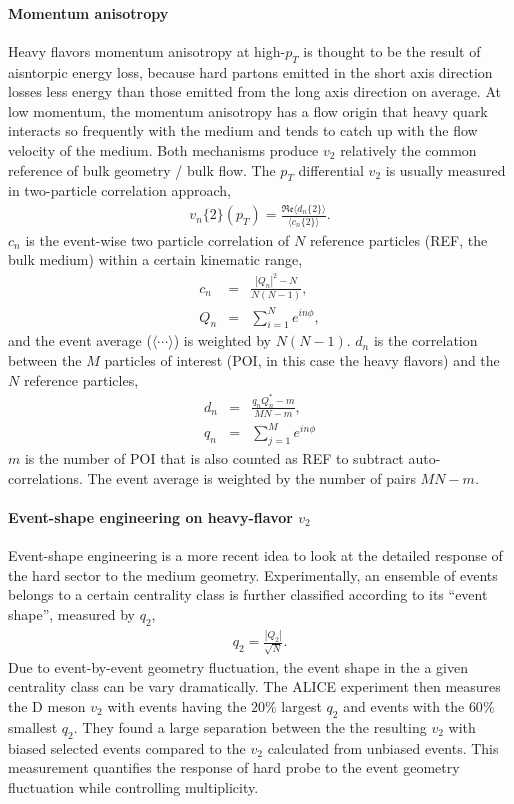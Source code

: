 \paragraph{Momentum anisotropy}
Heavy flavors momentum anisotropy at high-$p_T$ is thought to be the result of aisntorpic energy loss, because hard partons emitted in the short axis direction losses less energy than those emitted from the long axis direction on average.
At low momentum, the momentum anisotropy has a flow origin that heavy quark interacts so frequently with the medium and tends to catch up with the flow velocity of the medium.
Both mechanisms produce $v_2$ relatively the common reference of bulk geometry / bulk flow.
The $p_T$ differential $v_2$ is usually measured in two-particle correlation approach,
\begin{eqnarray}
v_n\{2\}(p_T) = \frac{\mathfrak{Re}\langle d_n\{2\} \rangle}{\langle c_n\{2\}\rangle}.
\end{eqnarray}
$c_n$ is the event-wise two particle correlation of $N$ reference particles (REF, the bulk medium) within a certain kinematic range,
\begin{eqnarray}
c_n &=& \frac{|Q_n|^2 - N}{N(N-1)},  \\
Q_n &=& \sum_{i=1}^N e^{i n \phi},
\end{eqnarray}
and the event average ($\langle\cdots\rangle$) is weighted by $N(N-1)$.
$d_n$ is the correlation between the $M$ particles of interest (POI, in this case the heavy flavors) and the $N$ reference particles,
\begin{eqnarray}
d_n &=& \frac{q_n Q_n^* - m}{MN-m},  \\
q_n &=& \sum_{j=1}^M e^{i n \phi}
\end{eqnarray}
$m$ is the number of POI that is also counted as REF to subtract auto-correlations. 
The event average is weighted by the number of pairs $MN-m$.

\paragraph{Event-shape engineering on heavy-flavor $v_2$}
Event-shape engineering is a more recent idea to look at the detailed response of the hard sector to the medium geometry.
Experimentally, an ensemble of events belongs to a certain centrality class is further classified according to its ``event shape'', measured by $q_2$,
\begin{eqnarray}
q_2 = \frac{|Q_2|}{\sqrt{N}}.
\end{eqnarray}
Due to event-by-event geometry fluctuation, the event shape in the a given centrality class can be vary dramatically.
The ALICE experiment then measures the D meson $v_2$ with events having the $20\%$ largest $q_2$ and events with the $60\%$ smallest $q_2$.
They found a large separation between the the resulting $v_2$ with biased selected events compared to the $v_2$ calculated from unbiased events.
This measurement quantifies the response of hard probe to the event geometry fluctuation while controlling multiplicity. 

